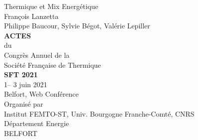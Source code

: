 \begin{titlepage}
\center\scshape

\LARGE

Thermique et Mix Energétique\\
%
\vspace{1em}
%
\normalsize
François Lanzetta\\
Philippe Baucour, Sylvie Bégot, Valérie Lepiller\\
%
{\Huge\bfseries
ACTES\\
%
}
\vspace{1em}
%
du\\
%
\vspace{1em}
%
{\Huge
Congrès Annuel de la\\
Société Française de Thermique\\
}
%
%
{\Huge\bfseries SFT 2021}\\
%
%
{\Large 1\ier -- 3 juin 2021\\Belfort, Web Conférence\\}
%
%
\Large
Organisé par\\
%
\vspace{1em}
%
\normalsize
Institut FEMTO-ST, Univ. Bourgogne Franche-Comté, CNRS\\
Département Energie \\
BELFORT
%
\end{titlepage}
